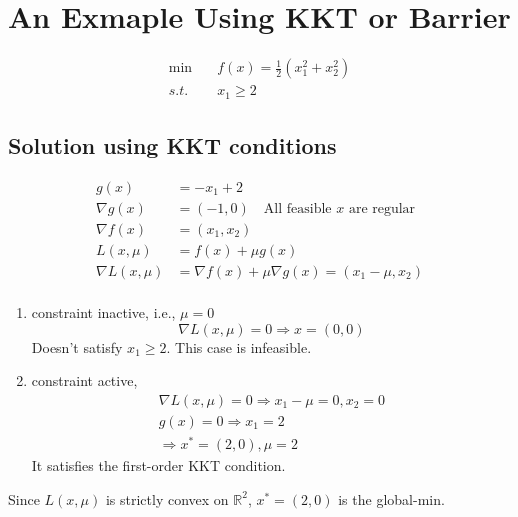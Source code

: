 \documentclass[11pt]{elegantbook}
\begin{document}
\section{An Exmaple Using KKT or Barrier}
\begin{example}
\begin{equation}
    \begin{aligned}
        \min\quad&f(x)=\frac{1}{2}(x_1^2+x_2^2)\\
        s.t.\ & x_1\geq 2
    \end{aligned}
    \nonumber
\end{equation}
\end{example}
\subsection{Solution using KKT conditions}
\begin{equation}
    \begin{aligned}
        g(x)&=-x_1+2\\
        \nabla g(x)&=(-1,0)\quad \text{All feasible $x$ are regular}\\
        \nabla f(x)&=(x_1,x_2)\\
        L(x,\mu)&=f(x)+\mu g(x)\\
        \nabla L(x,\mu)&=\nabla f(x)+\mu \nabla g(x)=(x_1-\mu,x_2)\\
    \end{aligned}
    \nonumber
\end{equation}
\begin{enumerate}
    \item constraint inactive, i.e., $\mu=0$
    $$\nabla L(x,\mu)=0 \Rightarrow	x=(0,0)$$
    Doesn't satisfy $x_1\geq 2$. This case is infeasible.
    \item constraint active,
    \begin{equation}
        \begin{aligned}
            \nabla L(x,\mu)=0 \Rightarrow x_1-\mu=0,x_2=0\\
            g(x)=0 \Rightarrow x_1=2\\
            \Rightarrow	x^*=(2,0), \mu=2
        \end{aligned}
        \nonumber
    \end{equation}
    It satisfies the first-order KKT condition.
\end{enumerate}
Since $L(x,\mu)$ is strictly convex on $\mathbb{R}^2$, $x^*=(2,0)$ is the global-min.
\end{document}
